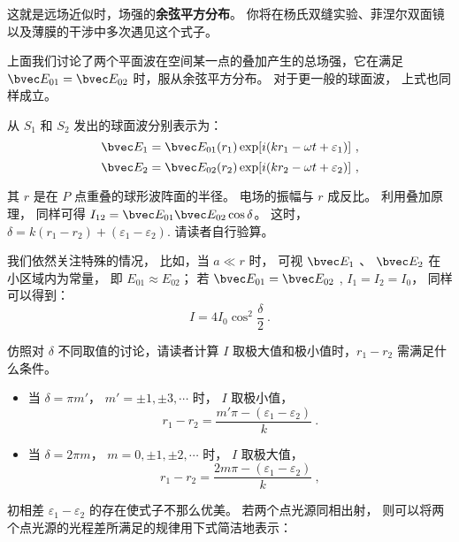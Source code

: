 这就是远场近似时，场强的\textbf{余弦平方分布}。 你将在杨氏双缝实验、菲涅尔双面镜以及薄膜的干涉中多次遇见这个式子。

上面我们讨论了两个平面波在空间某一点的叠加产生的总场强，它在满足 $ \bvec E_{01} = \bvec E_{02}$ 时，服从余弦平方分布。 对于更一般的球面波， 上式也同样成立。 

从 $ S_1 $ 和 $ S_2 $ 发出的球面波分别表示为：
$$ \bvec E_1 = \bvec E_{ 01 } ( r_1 ) \exp[ i( k r_1 - \omega t+ \varepsilon_1 )]~,$$
$$ \bvec E_2 = \bvec E_{ 02 } ( r_2 ) \exp[ i( k r_2 - \omega t+ \varepsilon_2 )]~,$$

其 $ r $ 是在 $ P $ 点重叠的球形波阵面的半径。 电场的振幅与 $ r $ 成反比。 利用叠加原理， 同样可得 $I_{12} = \bvec E_{01}\bvec E_{02} \cos\delta$。 这时， $ \delta = k ( r_1 - r_2 ) + ( \varepsilon_1 - \varepsilon_2 )$.  请读者自行验算。

我们依然关注特殊的情况， 比如，当 $ a \ll r $ 时， 可视 $ \bvec E_1$ 、 $ \bvec E_2$ 在小区域内为常量， 即 $ E_{ 01} \approx E_{02}$； 若 $ \bvec E_{01} = \bvec E_{02} $ , $ I_1 = I_2 = I_0 $， 同样可以得到：
\begin{equation}
 I = 4 I_0 \cos ^2\dfrac { \delta } { 2 }~.
\end{equation}

\begin{exercise}{}
仿照对 $ \delta$ 不同取值的讨论，请读者计算 $ I $ 取极大值和极小值时，$ r_1 - r_2 $ 需满足什么条件。
\end{exercise}

\begin{itemize}
\item 当 $ \delta = \pi m'$， $ m' = \pm 1, \pm 3, \cdots $ 时， $ I $ 取极小值， 
\begin{equation}
r_1 - r_2 = \dfrac{ m' \pi - ( \varepsilon _1 - \varepsilon _2)} { k }~.
\end{equation}
\item 当 $ \delta = 2 \pi m$， $ m = 0, \pm 1, \pm 2, \cdots $ 时， $ I $ 取极大值， 
\begin{equation}
 r_1 - r_2 = \dfrac{ 2m \pi - ( \varepsilon _1 - \varepsilon _2)} { k }~,
\end{equation}
\end{itemize}

初相差 $ \varepsilon_1 - \varepsilon_2 $ 的存在使式子不那么优美。 若两个点光源同相出射， 则可以将两个点光源的光程差所满足的规律用下式简洁地表示：

